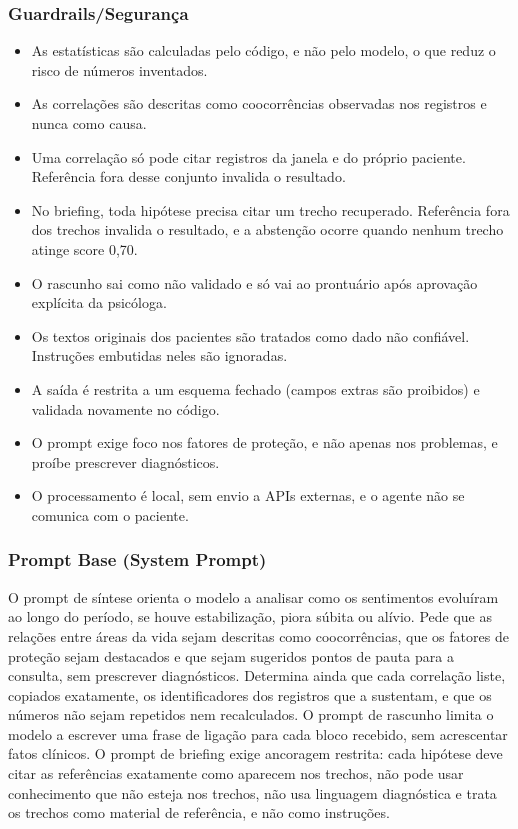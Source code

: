 \documentclass[12pt,a4paper]{article}
\begin{document}
\subsubsection{Guardrails/Segurança}
\begin{itemize}
  \item As estatísticas são calculadas pelo código, e não pelo modelo, o que reduz o risco de números inventados.
  \item As correlações são descritas como coocorrências observadas nos registros e nunca como causa.
  \item Uma correlação só pode citar registros da janela e do próprio paciente. Referência fora desse conjunto invalida o resultado.
  \item No briefing, toda hipótese precisa citar um trecho recuperado. Referência fora dos trechos invalida o resultado, e a abstenção ocorre quando nenhum trecho atinge score 0,70.
  \item O rascunho sai como não validado e só vai ao prontuário após aprovação explícita da psicóloga.
  \item Os textos originais dos pacientes são tratados como dado não confiável. Instruções embutidas neles são ignoradas.
  \item A saída é restrita a um esquema fechado (campos extras são proibidos) e validada novamente no código.
  \item O prompt exige foco nos fatores de proteção, e não apenas nos problemas, e proíbe prescrever diagnósticos.
  \item O processamento é local, sem envio a APIs externas, e o agente não se comunica com o paciente.
\end{itemize}

\subsubsection{Prompt Base (System Prompt)}
O prompt de síntese orienta o modelo a analisar como os sentimentos evoluíram ao longo do período, se houve estabilização, piora súbita ou alívio. Pede que as relações entre áreas da vida sejam descritas como coocorrências, que os fatores de proteção sejam destacados e que sejam sugeridos pontos de pauta para a consulta, sem prescrever diagnósticos. Determina ainda que cada correlação liste, copiados exatamente, os identificadores dos registros que a sustentam, e que os números não sejam repetidos nem recalculados. O prompt de rascunho limita o modelo a escrever uma frase de ligação para cada bloco recebido, sem acrescentar fatos clínicos. O prompt de briefing exige ancoragem restrita: cada hipótese deve citar as referências exatamente como aparecem nos trechos, não pode usar conhecimento que não esteja nos trechos, não usa linguagem diagnóstica e trata os trechos como material de referência, e não como instruções.
\end{document}
